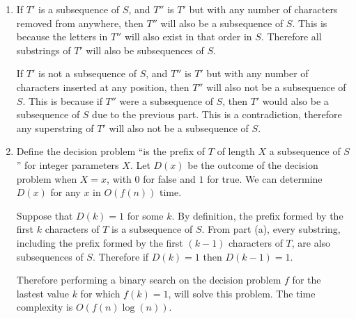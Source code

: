 \documentclass{article}
\begin{document}
\begin{solution}
\begin{enumerate}[label = (\alph*)]
    \item If $T'$ is a subsequence of $S$, and $T''$ is $T'$ but with any number of characters removed from anywhere, then $T''$ will also be a subsequence of $S$.
    This is because the letters in $T''$ will also exist in that order in $S$. Therefore all substrings of $T'$ will also be subsequences of $S$.

    If $T'$ is not a subsequence of $S$, and $T''$ is $T'$ but with any number of characters inserted at any position,
    then $T''$ will also not be a subsequence of $S$. This is because if $T''$ were a subsequence of $S$, then $T'$ would also be a subsequence of $S$ due to the previous part.
    This is a contradiction, therefore any superstring of $T'$ will also not be a subsequence of $S$.

    \item Define the decision problem ``is the prefix of $T$ of length $X$ a subsequence of $S$'' for integer parameters $X$.
    Let $D(x)$ be the outcome of the decision problem when $X=x$,
    with $0$ for false and $1$ for true. We can determine $D(x)$ for any $x$ in $O(f(n))$ time.
    
    Suppose that $D(k)=1$ for some $k$. By definition, the prefix formed by the first $k$ characters of $T$ is a subsequence of $S$. 
    From part (a), every substring, including the prefix formed by the first $(k-1)$ characters of $T$, are also subsequences of $S$. Therefore if $D(k)=1$ then $D(k-1)=1$.

    Therefore performing a binary search on the decision problem $f$ for the lastest value $k$ for which $f(k)=1$, 
    will solve this problem. The time complexity is $O(f(n)\log (n))$.
\end{enumerate}
\end{solution}
\end{document}
